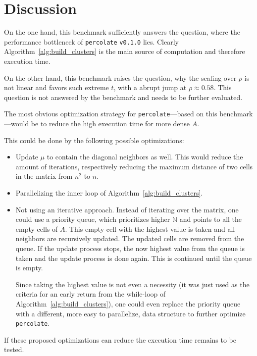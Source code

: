 \documentclass[twoside,11pt]{article}
\def\perc{\texttt{perco\-late}}
\def\v{\texttt{v0.1.0}}
\begin{document}

\section{Discussion} %

On the one hand, this benchmark sufficiently answers the
question, where the performance bottleneck of \perc{} \v{}
lies.
Clearly Algorithm~\ref{alg:build_clusters} is the main
source of computation and therefore execution time.

On the other hand, this benchmark raises the question, why
the scaling over $\rho$ is not linear and favors such
extreme $t$, with a abrupt jump at $\rho \approx 0.58$.
This question is not answered by the benchmark and needs to
be further evaluated.

The most obvious optimization strategy for \perc{}---based
on this benchmark---would be to reduce the high execution
time for more dense $A$.

This could be done by the following possible optimizations:
\begin{itemize}
  \item Update $\mu$ to contain the diagonal neighbors as
        well. This would reduce the amount of iterations,
        respectively reducing the maximum distance of two
        cells in the matrix from $n^2$ to $n$.

  \item Parallelizing the inner loop of
        Algorithm~\ref{alg:build_clusters}.

  \item Not using an iterative approach. Instead of
        iterating over the matrix, one could use a priority
        queue, which prioritizes higher $\mathbb{N}$
        and points to all the empty cells of $A$.
        This empty cell with the highest value is taken and
        all neighbors are recursively updated.
        The updated cells are removed from the queue.
        If the update process stops, the now highest value
        from the queue is taken and the update
        process is done again.
        This is continued until the queue is empty.

        Since taking the highest value is not even a
        necessity (it was just used as the criteria for
        an early return from the while-loop of
        Algorithm~\ref{alg:build_clusters}), one could
        even replace the priority queue with a different,
        more easy to parallelize, data structure to further
        optimize \perc.

\end{itemize}
If these proposed optimizations can reduce the execution
time remains to be tested.
\end{document}
